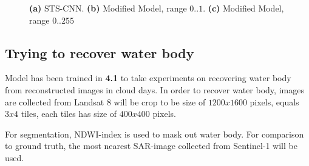 \begin{figure}[h!]
	\centering
	
	\centering
	\caption{
		\textbf{(a)} STS-CNN.
		\textbf{(b)} Modified Model, range $0..1$.
		\textbf{(c)} Modified Model, range $0..255$}
\end{figure}


\subsection{Trying to recover water body}
Model has been trained in \textbf{4.1} to take experiments on recovering water body from reconstructed images in cloud days. In order to recover water body, images are collected from Landsat 8 will be crop to be size of $1200 x 1600$ pixels, equals $3 x 4$ tiles, each tiles has size of $400 x 400$ pixels.  

For segmentation, NDWI-index is used to mask out water body. For comparison to ground truth, the most nearest SAR-image collected from Sentinel-1 will be used. 

